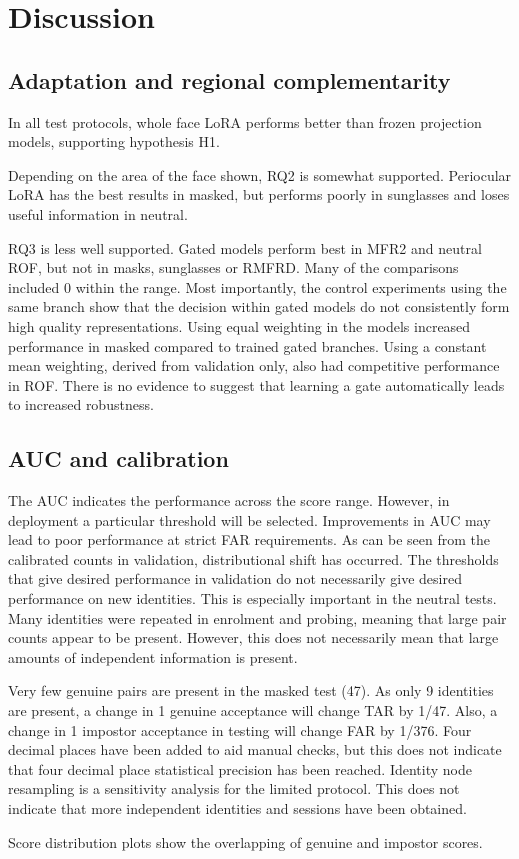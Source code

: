 \documentclass[10pt,lettersize,journal]{IEEEtran}
\begin{document}
\section{Discussion}
\subsection{Adaptation and regional complementarity}
In all test protocols, whole face LoRA performs better than frozen projection models, supporting hypothesis H1.\par
Depending on the area of the face shown, RQ2 is somewhat supported. Periocular LoRA has the best results in masked, but performs poorly in sunglasses and loses useful information in neutral.\par
RQ3 is less well supported. Gated models perform best in MFR2 and neutral ROF, but not in masks, sunglasses or RMFRD. Many of the comparisons included 0 within the range. Most importantly, the control experiments using the same branch show that the decision within gated models do not consistently form high quality representations. Using equal weighting in the models increased performance in masked compared to trained gated branches. Using a constant mean weighting, derived from validation only, also had competitive performance in ROF. There is no evidence to suggest that learning a gate automatically leads to increased robustness.\par
\subsection{AUC and calibration}
The AUC indicates the performance across the score range. However, in deployment a particular threshold will be selected. Improvements in AUC may lead to poor performance at strict FAR requirements. As can be seen from the calibrated counts in validation, distributional shift has occurred. The thresholds that give desired performance in validation do not necessarily give desired performance on new identities. This is especially important in the neutral tests. Many identities were repeated in enrolment and probing, meaning that large pair counts appear to be present. However, this does not necessarily mean that large amounts of independent information is present.\par
Very few genuine pairs are present in the masked test (47). As only 9 identities are present, a change in 1 genuine acceptance will change TAR by 1/47. Also, a change in 1 impostor acceptance in testing will change FAR by 1/376. Four decimal places have been added to aid manual checks, but this does not indicate that four decimal place statistical precision has been reached. Identity node resampling is a sensitivity analysis for the limited protocol. This does not indicate that more independent identities and sessions have been obtained.\par
Score distribution plots show the overlapping of genuine and impostor scores.\par
\end{document}
